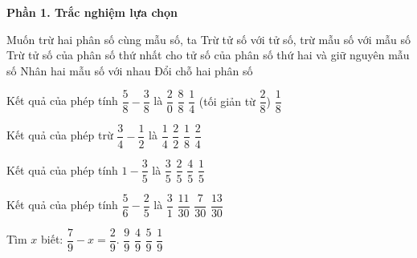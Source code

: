 \textbf{Phần 1. Trắc nghiệm lựa chọn}

\begin{ex} %
Muốn trừ hai phân số cùng mẫu số, ta
\choice
{Trừ tử số với tử số, trừ mẫu số với mẫu số}
{\True Trừ tử số của phân số thứ nhất cho tử số của phân số thứ hai và giữ nguyên mẫu số}
{Nhân hai mẫu số với nhau}
{Đổi chỗ hai phân số}
\end{ex}

\begin{ex} %
Kết quả của phép tính $\dfrac{5}{8} - \dfrac{3}{8}$ là
\choice
{$\dfrac{2}{0}$}
{$\dfrac{8}{8}$}
{\True $\dfrac{1}{4}$ (tối giản từ $\dfrac{2}{8}$)}
{$\dfrac{1}{8}$}
\end{ex}

\begin{ex} %
Kết quả của phép trừ $\dfrac{3}{4} - \dfrac{1}{2}$ là
\choice
{\True $\dfrac{1}{4}$}
{$\dfrac{2}{2}$}
{$\dfrac{1}{8}$}
{$\dfrac{2}{4}$}
\end{ex}

\begin{ex} %
Kết quả của phép tính $1 - \dfrac{3}{5}$ là
\choice
{$\dfrac{3}{5}$}
{\True $\dfrac{2}{5}$}
{$\dfrac{4}{5}$}
{$\dfrac{1}{5}$}
\end{ex}

\begin{ex} %
Kết quả của phép tính $\dfrac{5}{6} - \dfrac{2}{5}$ là
\choice
{$\dfrac{3}{1}$}
{$\dfrac{11}{30}$}
{$\dfrac{7}{30}$}
{\True $\dfrac{13}{30}$}
\end{ex}

\begin{ex} %
Tìm $x$ biết: $\dfrac{7}{9} - x = \dfrac{2}{9}$.
\choice
{$\dfrac{9}{9}$}
{$\dfrac{4}{9}$}
{\True $\dfrac{5}{9}$}
{$\dfrac{1}{9}$}
\end{ex}

